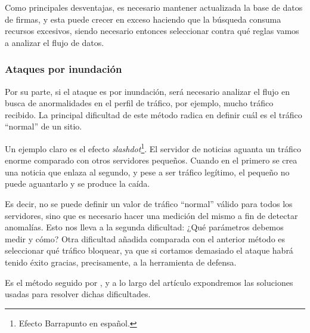 Como principales desventajas, es necesario mantener actualizada la base de datos de firmas, y esta
puede crecer en exceso haciendo que la búsqueda consuma recursos excesivos, siendo necesario entonces
seleccionar contra qué reglas vamos a analizar el flujo de datos.

\subsubsection{Ataques por inundación}\label{sssec:ddos_deteccion_inundacion}
Por su parte, si el ataque es por inundación, será necesario analizar el flujo en busca de anormalidades
en el perfil de tráfico, por ejemplo, mucho tráfico recibido. La principal dificultad de este método radica
en definir cuál es el tráfico ``normal'' de un sitio.

Un ejemplo claro es el efecto \emph{slashdot}\footnote{Efecto Barrapunto en español.}. El servidor de noticias
aguanta un tráfico enorme comparado con otros servidores pequeños. Cuando en el primero se crea una noticia que
enlaza al segundo, y pese a ser tráfico legítimo, el pequeño no puede aguantarlo y se produce la caída.

Es decir, no se puede definir un valor de tráfico ``normal'' válido para todos los servidores, sino que es
necesario hacer una medición del mismo a fin de detectar anomalías. Esto nos lleva a la segunda dificultad:
¿Qué parámetros debemos medir y cómo? Otra dificultad añadida comparada con el anterior método es 
seleccionar qué tráfico bloquear, ya
que si cortamos demasiado el ataque habrá tenido éxito gracias, precisamente, a la herramienta de defensa.

Es el método seguido por \redborderddos, y a lo largo del artículo expondremos las soluciones usadas para 
resolver dichas dificultades.

\endinput
